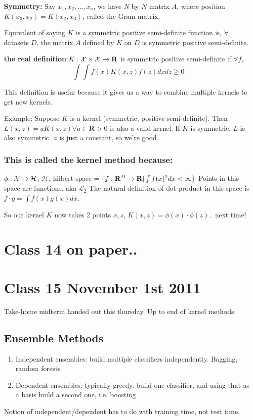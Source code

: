 \textbf{Symmetry:}
Say $x_1, x_2, \dots, x_n$, we have $N$ by $N$ matrix $A$, where
position $K(x_3,x_2) = K(x_2,x_3)$, called the Gram matrix.

Equivalent of saying $K$ is a symmetric positive semi-definite
function is,  $\forall$ datasets $D$, the matrix $A$ defined by $K$ on
$D$ is symmetric positive semi-definite.

\textbf{the real definition}:$K:\mathcal{X}\times \mathcal{X} \rightarrow
\mathbf{R}$ is symmetric positive semi-definite if $\forall f$, $$\int \int 
f(x)K(x,z)f(z) dx dz \ge 0$$

This definition is useful because it gives us a way to combine
multiple kernels to get new kernels.

Example: Suppose $K$ is a kernel (symmetric, positive
semi-definite). Then $L(x,z) = aK(x,z)\forall a\in \mathbf{R} > 0$ is
also a valid kernel. If $K$ is symmetric, $L$ is also symmetric. $a$
is just a constant, so we're good.

\subsubsection{This is called the kernel method because:}
$\phi: \mathcal{X} \rightarrow \mathcal{H}$, $\mathcal{H}$, hilbert space $
= \{ f: \mathbf{R}^D \rightarrow \mathbf{R} | \int f(x)^2 dx < \infty \}$
Points in this space are functions. aka $\mathcal{L}_2$
The natural definition of dot product in this space is $f\cdot g =
\int f(x)g(x) dx$.

So our kernel $K$ now takes 2 points $x,z$, $K(x,z) = \phi(x)\cdot
\phi(z)$.. next time!

\pagebreak
\section{Class 14 on paper..}
\label{sec:class14}
\pagebreak
\section{Class 15 November 1st 2011}
\label{sec:class15}
Take-home midterm handed out this thursday. Up to end of kernel
methods.

\subsection{Ensemble Methods}

\begin{enumerate}
\item Independent ensembles: build multiple classifiers
  independently. Bagging, random forests
\item Dependent ensembles: typically greedy, build one classifier, and
  using that as a basis build a second one, i.e. boosting
\end{enumerate}
Notion of independent/dependent has to do with training time, not test
time.

